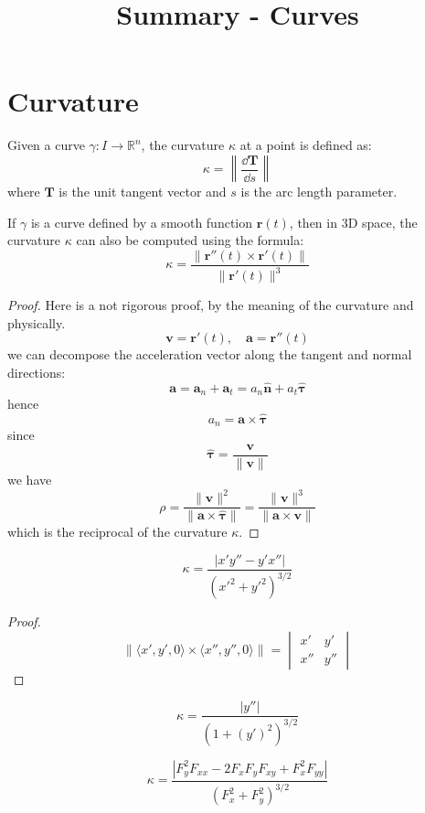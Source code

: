 \documentclass{template}
\title{Summary - Curves}
\begin{document}
\maketitle

\section{Curvature}

Given a curve $\gamma: I \to \mathbb{R}^n$, the curvature $\kappa$ at a point is defined as:
\[
	\kappa = \left\| \frac{\dd \boldsymbol{T}}{\dd s} \right\|
\] 
where $\boldsymbol{T}$ is the unit tangent vector and $s$ is the arc length parameter.

\begin{theorem}
	If $\gamma$ is a curve defined by a smooth function $\boldsymbol{r}(t)$, then
	in 3D space, the curvature $\kappa$ can also be computed using the formula:
	\[
		\kappa = \frac{\|\boldsymbol{r}''(t) \times \boldsymbol{r}'(t)\|}{\|\boldsymbol{r}'(t)\|^3}
	\] 
	\begin{proof}
		Here is a not rigorous proof, by the meaning of the curvature and physically.
		\[
			\boldsymbol{v} = \boldsymbol{r}'(t), \quad \boldsymbol{a} = \boldsymbol{r}''(t)
		\] 
		we can decompose the acceleration vector along the tangent and normal directions:
		\[
			\boldsymbol{a} = \boldsymbol{a}_n + \boldsymbol{a}_t
			= a_n \hat{\boldsymbol{n}} + a_t \hat{\boldsymbol{\tau}}
		\] 
		hence
		\[
			a_n = \boldsymbol{a} \times \hat{\boldsymbol{\tau}}
		\] 
		since
		\[
			\hat{\boldsymbol{\tau}} = \frac{\boldsymbol{v}}{\|\boldsymbol{v}\|}
		\] 
		we have
		\[
			\rho = \frac{\|\boldsymbol{v}\|^2}{\|\boldsymbol{a} \times \hat{\boldsymbol{\tau}}\|}
			= \frac{\|\boldsymbol{v}\|^3}{\|\boldsymbol{a} \times \boldsymbol{v}\|}
		\] 
		which is the reciprocal of the curvature $\kappa$.
		
	\end{proof}
\end{theorem}

\begin{theorem}
	\[
		\kappa = \frac{|x'y'' - y'x''|}{(x'^2 + y'^2)^{3/2}}
	\] 
	\begin{proof}
		\[
		\|\langle x', y', 0 \rangle \times \langle x'', y'', 0 \rangle\|
		= 
		\begin{vmatrix} x' & y' \\ x'' & y'' \end{vmatrix}
		\] 
	\end{proof}
\end{theorem}
\begin{theorem}[Curvature for Plane Cartesian $y=f(x)$]
	\[
		\kappa = \frac{|y''|}{(1 + (y')^2)^{3/2}}
	\] 
\end{theorem}
\begin{theorem}[Curvature for Plane Cartesian Implicit Curves $F(x,y)=0$]
	\[
		\kappa = \frac{|F_y^2 F_{xx} - 2 F_x F_y F_{xy} + F_x^2 F_{yy}|}{(F_x^2 + F_y^2)^{3/2}}
	\]
	
\end{theorem}
\end{document}
